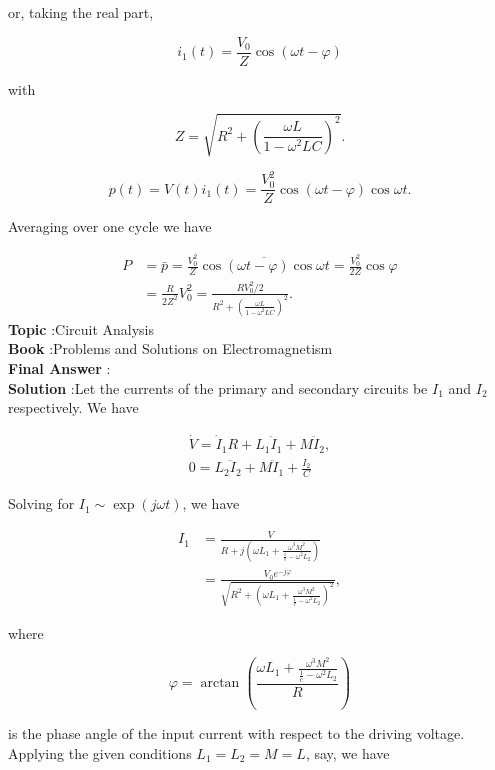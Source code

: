 \documentclass[10pt]{article}
\begin{document}
or, taking the real part,

$$
i_{1}(t)=\frac{V_{0}}{Z} \cos (\omega t-\varphi)
$$

with

$$
Z=\sqrt{R^{2}+\left(\frac{\omega L}{1-\omega^{2} L C}\right)^{2}} .
$$



$$
p(t)=V(t) i_{1}(t)=\frac{V_{0}^{2}}{Z} \cos (\omega t-\varphi) \cos \omega t .
$$

Averaging over one cycle we have

$$
\begin{aligned}
P &=\bar{p}=\frac{V_{0}^{2}}{Z} \overline{\cos (\omega t-\varphi) \cos \omega t}=\frac{V_{0}^{2}}{2 Z} \cos \varphi \\
&=\frac{R}{2 Z^{2}} V_{0}^{2}=\frac{R V_{0}^{2} / 2}{R^{2}+\left(\frac{\omega L}{1-\omega^{2} L C}\right)^{2}} .
\end{aligned}
$$
\textbf{Topic} :Circuit Analysis\\
\textbf{Book} :Problems and Solutions on Electromagnetism\\
\textbf{Final Answer} :\\


\textbf{Solution} :Let the currents of the primary and secondary circuits be $I_{1}$ and $I_{2}$ respectively. We have

$$
\begin{gathered}
\dot{V}=\dot{I}_{1} R+L_{1} \ddot{I}_{1}+M \ddot{I}_{2}, \\
0=L_{2} \ddot{I}_{2}+M \ddot{I}_{1}+\frac{I_{2}}{C}
\end{gathered}
$$

Solving for $I_{1} \sim \exp (j \omega t)$, we have

$$
\begin{aligned}
I_{1} &=\frac{V}{R+j\left(\omega L_{1}+\frac{\omega^{3} M^{2}}{\frac{1}{c}-\omega^{2} L_{2}}\right)} \\
&=\frac{V_{0} e^{-j \varphi}}{\sqrt{R^{2}+\left(\omega L_{1}+\frac{\omega^{3} M^{2}}{\frac{1}{c}-\omega^{2} L_{2}}\right)^{2}}},
\end{aligned}
$$

where

$$
\varphi=\arctan \left(\frac{\omega L_{1}+\frac{\omega^{3} M^{2}}{\frac{1}{c}-\omega^{2} L_{2}}}{R}\right)
$$

is the phase angle of the input current with respect to the driving voltage. Applying the given conditions $L_{1}=L_{2}=M=L$, say, we have
\end{document}
